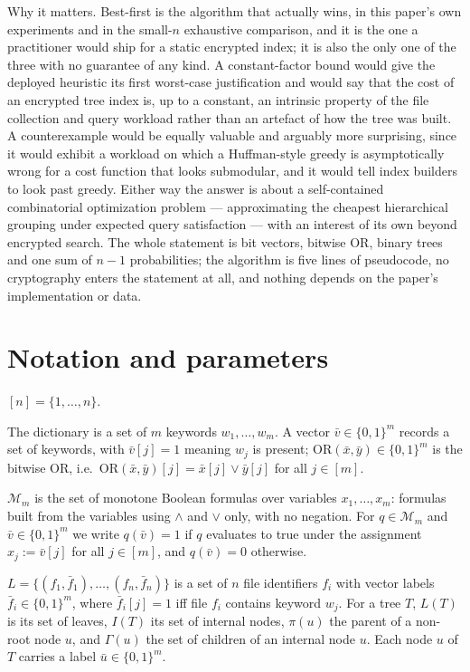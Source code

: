 \documentclass{conjura-conjecture}
\newcommand{\bits}{\{0,1\}}
\newcommand{\Mon}{\mathcal{M}}
\newcommand{\ORv}{\mathrm{OR}}
\begin{document}
Why it matters. Best-first is the algorithm that actually wins, in this
paper's own experiments and in the small-$n$ exhaustive comparison, and
it is the one a practitioner would ship for a static encrypted index; it
is also the only one of the three with no guarantee of any kind. A
constant-factor bound would give the deployed heuristic its first
worst-case justification and would say that the cost of an encrypted tree
index is, up to a constant, an intrinsic property of the file collection
and query workload rather than an artefact of how the tree was built. A
counterexample would be equally valuable and arguably more surprising,
since it would exhibit a workload on which a Huffman-style greedy is
asymptotically wrong for a cost function that looks submodular, and it
would tell index builders to look past greedy. Either way the answer is
about a self-contained combinatorial optimization problem ---
approximating the cheapest hierarchical grouping under expected query
satisfaction --- with an interest of its own beyond encrypted search. The
whole statement is bit vectors, bitwise OR, binary trees and one sum of
$n-1$ probabilities; the algorithm is five lines of pseudocode, no
cryptography enters the statement at all, and nothing depends on the
paper's implementation or data.

\section{Notation and parameters}\label{sec:notation}

$[n] = \{1,\dots,n\}$.

The dictionary is a set of $m$ keywords $w_1,\dots,w_m$. A vector
$\bar v \in \bits^m$ records a set of keywords, with $\bar v[j] = 1$
meaning $w_j$ is present; $\ORv(\bar x,\bar y) \in \bits^m$ is the
bitwise OR, i.e.\ $\ORv(\bar x,\bar y)[j] = \bar x[j] \vee \bar y[j]$ for
all $j \in [m]$.

$\Mon_m$ is the set of monotone Boolean formulas over variables
$x_1,\dots,x_m$: formulas built from the variables using $\wedge$ and
$\vee$ only, with no negation. For $q \in \Mon_m$ and
$\bar v \in \bits^m$ we write $q(\bar v) = 1$ if $q$ evaluates to true
under the assignment $x_j := \bar v[j]$ for all $j \in [m]$, and
$q(\bar v) = 0$ otherwise.

$L = \{(f_1,\bar f_1),\dots,(f_n,\bar f_n)\}$ is a set of $n$ file
identifiers $f_i$ with vector labels $\bar f_i \in \bits^m$, where
$\bar f_i[j] = 1$ iff file $f_i$ contains keyword $w_j$. For a tree $T$,
$L(T)$ is its set of leaves, $I(T)$ its set of internal nodes, $\pi(u)$
the parent of a non-root node $u$, and $\Gamma(u)$ the set of children of
an internal node $u$. Each node $u$ of $T$ carries a label
$\bar u \in \bits^m$.
\end{document}
